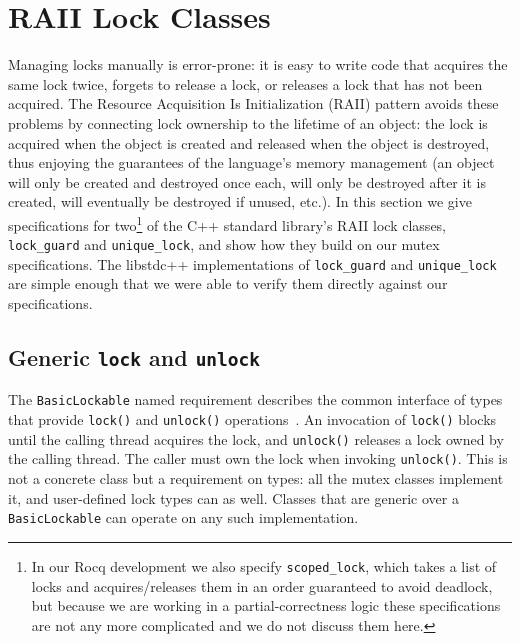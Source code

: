 \documentclass[acmsmall,screen,review,anonymous]{acmart}
\begin{document}


\section{RAII Lock Classes}

\newcommand{\lguard}[0]{\ensuremath{\mathsf{lguard}}}
\newcommand{\ulock}[0]{\ensuremath{\mathsf{ulock}}}

Managing locks manually is error-prone: it is easy to write code that acquires the same lock twice, forgets to release a lock, or releases a lock that has not been acquired. The Resource Acquisition Is Initialization (RAII) pattern avoids these problems by connecting lock ownership to the lifetime of an object: the lock is acquired when the object is created and released when the object is destroyed, thus enjoying the guarantees of the language's memory management (an object will only be created and destroyed once each, will only be destroyed after it is created, will eventually be destroyed if unused, etc.). In this section we give specifications for two\footnote{In our Rocq development we also specify \lstinline{scoped_lock}, which takes a list of locks and acquires/releases them in an order guaranteed to avoid deadlock, but because we are working in a partial-correctness logic these specifications are not any more complicated and we do not discuss them here.} of the C++ standard library's RAII lock classes, \lstinline{lock_guard} and \lstinline{unique_lock}, and show how they build on our mutex specifications. %
The libstdc++ implementations of \lstinline{lock_guard} and \lstinline{unique_lock} are simple enough that we were able to verify them directly against our specifications.

\subsection{Generic \lstinline{lock} and \lstinline{unlock}}
\label{basic-lockable}
The \lstinline{BasicLockable} named requirement describes the common interface
of types that provide \lstinline{lock()} and \lstinline{unlock()}
operations~\cite{ISO:2024:IIP}.  An invocation of \lstinline{lock()} blocks
until the calling thread acquires the lock, and \lstinline{unlock()} releases a
lock owned by the calling thread. The caller must own the lock when invoking \lstinline{unlock()}.
This is not a concrete class but a requirement on types: all the mutex classes implement it, and
user-defined lock types can as well.  Classes that are generic over a \lstinline{BasicLockable}
can operate on any such implementation.
\end{document}
